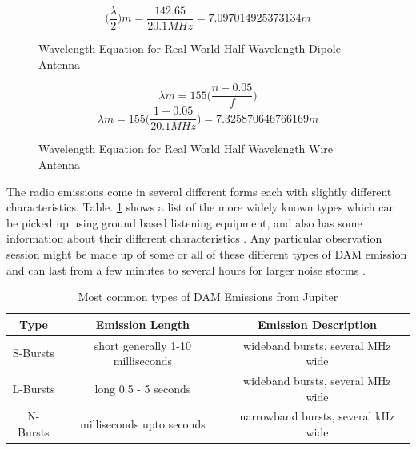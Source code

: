 \documentclass[runningheads,a4paper]{llncs}
\begin{document}
%
\begin{figure}[here]
  \centering
  \begin{equation}  	
    \bigg(\frac{\lambda}{2}\bigg)m = \frac{142.65}{20.1 MHz} = 7.097014925373134 m
  \end{equation}
  \caption{Wavelength Equation for Real World Half Wavelength Dipole Antenna}
  \label{fig:wavelength_equation_dipole}
\end{figure}
%

%
\begin{figure}[here]
  \centering
  \begin{equation}  	
    \lambda m = 155 \bigg(\frac{n - 0.05}{f}\bigg)
  \end{equation}
  \begin{equation}  	
    \lambda m = 155 \bigg(\frac{1 - 0.05}{20.1 MHz}\bigg)  = 7.325870646766169 m
  \end{equation}
  \caption{Wavelength Equation for Real World Half Wavelength Wire Antenna}
  \label{fig:wavelength_equation_wire_antenna}
\end{figure}
%

The radio emissions come in several different forms each with slightly different characteristics. Table. \ref{tab:dam_emissions} shows a list of the more widely known types which can be picked up using ground based listening equipment, and also has some information about their different characteristics \citep{wilkinson94}. Any particular observation session might be made up of some or all of these different types of \gls{DAM} emission and can last from a few minutes to several hours for larger noise storms \citep{wilkinson94}.

%
\begin{table}
  \centering
  \begin{tabular}[pos]{| c | c | c |}
    \hline
    Type & Emission Length & Emission Description\\ \hline
    S-Bursts & short generally 1-10 milliseconds & wideband bursts, several MHz wide\\ \hline
    L-Bursts & long 0.5 - 5 seconds & wideband bursts, several MHz wide\\ \hline
    N-Bursts & milliseconds upto seconds & narrowband bursts, several kHz wide\\
    \hline
  \end{tabular}
  \caption{Most common types of DAM Emissions from Jupiter \citep{wilkinson94}}
  \label{tab:dam_emissions}
\end{table}
%
\end{document}
